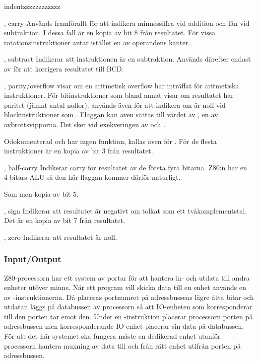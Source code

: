 \documentclass[main.tex]{subfiles}
\begin{document}
\begin{labeling}{indentzzzzzzzzzzzz}
    \item[\mono{C}, carry]
        Används framförallt för att indikera minnessiffra vid addition och lån
        vid subtraktion. I dessa fall är  en kopia av bit 8 från
        resultatet. För vissa rotationsinstruktioner antar  istället en
        av operandens kanter.
    \item[\mono{N}, subtract]
        Indikerar att instruktionen är en subtraktion. Används därefter endast
        av  för att korrigera resultatet till BCD.
    \item[\mono{P}, parity/overflow]
         visar om en aritmetisk overflow har inträffat för aritmetiska
        instruktioner. För bitinstruktioner som bland annat  visar
         om resultatet har paritet (jämnt antal nollor). 
        används även för att indikera om  är noll vid
        blockinstruktioner som . Flaggan kan även sättas till värdet
        av , en av avbrottsvipporna. Det sker vid exekveringen av
         och .
    \item[\mono{X}]
        Odokumenterad och har ingen funktion, kallas även för .  För
        de flesta instruktioner är  en kopia av bit 3 från resultatet.
    \item[\mono{H}, half-carry]
        Indikerar carry för resultatet av de första fyra bitarna. Z80:n har en
        4-bitars ALU så den här flaggan kommer därför naturligt.
    \item[\mono{Y}]
        Som  men kopia av bit 5.
    \item[\mono{S}, sign]
        Indikerar att resultatet är negativt om tolkat som ett
        tvåkomplementstal. Det är en kopia av bit 7 från resultatet.
    \item[\mono{Z}, zero]
        Indikerar att resultatet är noll.
\end{labeling}

\subsubsection{Input/Output}
Z80-processorn har ett system av portar för att hantera in- och utdata till
andra enheter utöver minne. När ett program vill skicka data till en enhet
används en av -instruktionerna. Då placeras portnumret på
adressbussens lägre åtta bitar och utdatan läggs på databussen av processorn så
att IO-enheten som korresponderar till den porten tar emot den. Under en
-instruktion placerar processorn porten på adressbussen men
korresponderande IO-enhet placerar sin data på databussen. För att det här
systemet ska fungera måste en dedikerad enhet utanför processorn hantera
muxning av data till och från rätt enhet utifrån porten på adressbussen.
\end{document}
